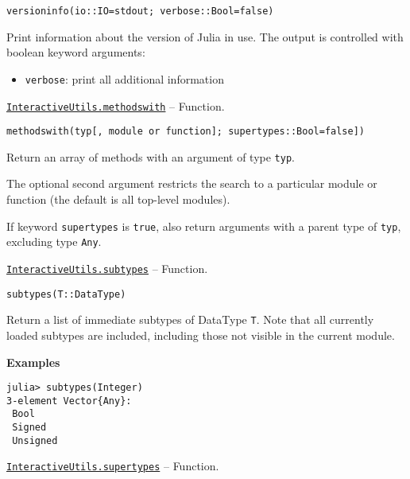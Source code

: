 \begin{adjustwidth}{2em}{0pt}


\begin{verbatim}
versioninfo(io::IO=stdout; verbose::Bool=false)
\end{verbatim}

Print information about the version of Julia in use. The output is controlled with boolean keyword arguments:

\begin{itemize}
\item \texttt{verbose}: print all additional information

\end{itemize}


\end{adjustwidth}
\hypertarget{1845157398882896709}{}
\hyperlink{1845157398882896709}{\texttt{InteractiveUtils.methodswith}}  -- {Function.}

\begin{adjustwidth}{2em}{0pt}


\begin{verbatim}
methodswith(typ[, module or function]; supertypes::Bool=false])
\end{verbatim}

Return an array of methods with an argument of type \texttt{typ}.

The optional second argument restricts the search to a particular module or function (the default is all top-level modules).

If keyword \texttt{supertypes} is \texttt{true}, also return arguments with a parent type of \texttt{typ}, excluding type \texttt{Any}.



\end{adjustwidth}
\hypertarget{13112219412833772146}{}
\hyperlink{13112219412833772146}{\texttt{InteractiveUtils.subtypes}}  -- {Function.}

\begin{adjustwidth}{2em}{0pt}


\begin{verbatim}
subtypes(T::DataType)
\end{verbatim}

Return a list of immediate subtypes of DataType \texttt{T}. Note that all currently loaded subtypes are included, including those not visible in the current module.

\textbf{Examples}


\begin{verbatim}
julia> subtypes(Integer)
3-element Vector{Any}:
 Bool
 Signed
 Unsigned
\end{verbatim}



\end{adjustwidth}
\hypertarget{16332427941947648850}{}
\hyperlink{16332427941947648850}{\texttt{InteractiveUtils.supertypes}}  -- {Function.}

